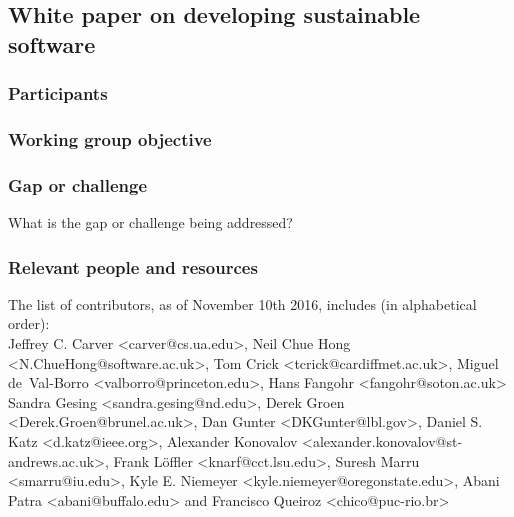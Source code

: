 \subsection{White paper on developing sustainable software}
\label{sec:best-practices-developing}



\subsubsection{Participants}


\subsubsection{Working group objective}


\subsubsection{Gap or challenge}

What is the gap or challenge being addressed?

\subsubsection{Relevant people and resources}

The list of contributors, as of November 10th 2016, includes (in alphabetical order): \\
Jeffrey C. Carver <carver@cs.ua.edu>,
Neil Chue Hong <N.ChueHong@software.ac.uk>,
Tom Crick <tcrick@cardiffmet.ac.uk>,
Miguel de~Val-Borro <valborro@princeton.edu>,
Hans Fangohr <fangohr@soton.ac.uk>
Sandra Gesing <sandra.gesing@nd.edu>,
Derek Groen <Derek.Groen@brunel.ac.uk>,
Dan Gunter <DKGunter@lbl.gov>,
Daniel S. Katz <d.katz@ieee.org>,
Alexander Konovalov <alexander.konovalov@st-andrews.ac.uk>,
Frank L\"offler <knarf@cct.lsu.edu>,
Suresh Marru <smarru@iu.edu>,
Kyle E. Niemeyer <kyle.niemeyer@oregonstate.edu>,
Abani Patra <abani@buffalo.edu>
and
Francisco Queiroz <chico@puc-rio.br>

